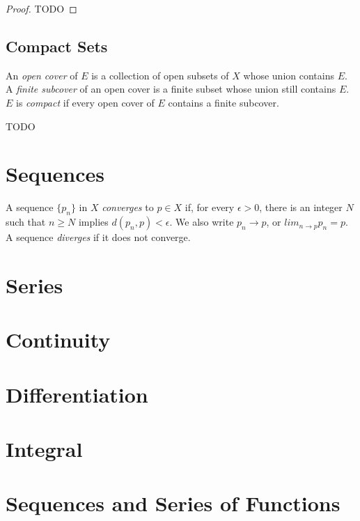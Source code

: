     \begin{proof}
        TODO
    \end{proof}
    
    \subsection{Compact Sets}
    
    \begin{defn} \label{def_analysis_compact}
        An \emph{open cover} of $E$ is a collection of open subsets of $X$ whose union contains $E$. A \emph{finite subcover} of an open cover is a finite subset whose union still contains $E$. $E$ is \emph{compact} if every open cover of $E$ contains a finite subcover.
    \end{defn}
    
    TODO
    
    \section{Sequences}
    
    \begin{defn}[Convergence] \label{def_analysis_converge}
        A sequence $\{p_n\}$ in $X$ \emph{converges} to $p \in X$ if, for every $\epsilon > 0$, there is an integer $N$ such that $n \geq N$ implies $d(p_n, p) < \epsilon$. We also write $p_n \rightarrow p$, or $lim_{n \rightarrow p} p_n = p$. A sequence \emph{diverges} if it does not converge.
    \end{defn}
    
    \section{Series}
    
    \section{Continuity}
    
    \section{Differentiation}
    
    \section{Integral}
    
    \section{Sequences and Series of Functions}

